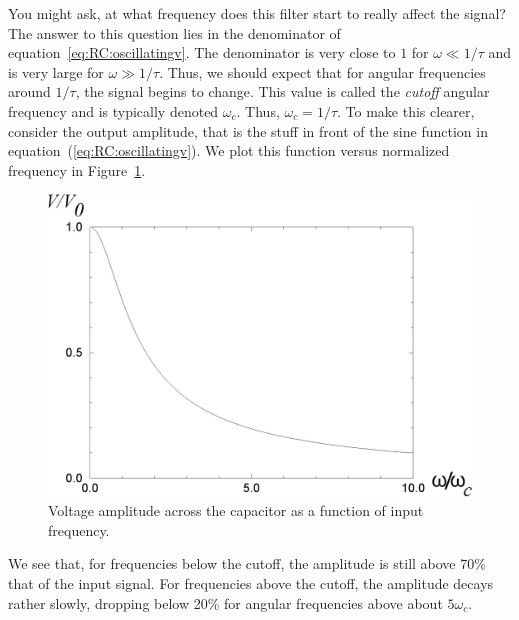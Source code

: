 You might ask, at what frequency does this filter start to really affect the 
signal? The answer to this question lies in the denominator of 
equation~\ref{eq:RC:oscillatingv}. The denominator is very close to $1$ for 
$\omega \ll 1/\tau$ and is very large for $\omega \gg 1/\tau$. Thus, we should
expect that for angular frequencies around $1/\tau$, the signal begins to
change. This value is called the {\em cutoff} angular frequency and is
typically denoted $\omega_c$. Thus, $\omega_c = 1/\tau$. To make this clearer,
consider the output amplitude, that is the stuff in front of the sine function
in equation~(\ref{eq:RC:oscillatingv}). We plot this function versus
normalized frequency in Figure~\ref{fig:RC:amplitude1}.
\begin{figure}[htb]
\centering 
\epsfxsize=10cm \includegraphics[scale=0.5]{5_rccircuits/campout.eps}
\caption{Voltage amplitude across the capacitor as a function of input 
frequency.}
\label{fig:RC:amplitude1}
\end{figure}
We see that, for frequencies below the cutoff, the amplitude is still above 
70\% that of the input signal. For frequencies above the cutoff, the amplitude 
decays rather slowly, dropping below 20\% for angular frequencies above about 
$5\omega_c$.

